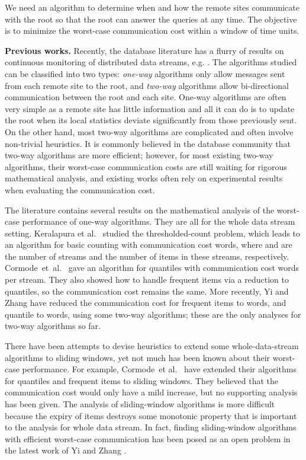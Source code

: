 \documentclass[proceedings]{stacs}
\theoremstyle{definition}\newtheorem{fact}{Fact}
\begin{document}
We need an algorithm to determine when and how
the remote sites communicate with the root so that the
root can answer the queries at any time.
The objective is to minimize the worst-case communication cost
within a window of  time units.



\vspace{.5ex}
{\bf Previous works.}
Recently, the database literature has a flurry of results on continuous
monitoring of distributed data streams, e.g.
\cite{OlstonJW03,GreenwaldK04,DasGGR04,SharfmanSK06,
ManjhiSDO05,CormodeGMR05,BabcockO03,JainYDZ05,MouratidisBP06,CormodeG05}.
The algorithms studied can be classified into two
types: {\em one-way} algorithms only allow messages
sent from each remote site to the root, and
{\em two-way} algorithms allow bi-directional
communication between the root and each site.
One-way algorithms are often very simple
as a remote site has little
information and all it can do is to update the root
when its local statistics deviate significantly from those previously sent.
On the other hand,
most two-way algorithms are complicated and
often involve non-trivial heuristics.
It is commonly believed in the database community
that two-way algorithms
are more efficient; however, for most
existing two-way algorithms, their worst-case communication costs
are still waiting for rigorous mathematical analysis, and
existing works often rely on experimental results when evaluating
the communication cost.



The literature contains several results on the
mathematical analysis of the worst-case
performance of one-way algorithms.
They are all for the whole data stream setting.
Keralapura et al.\ \cite{KeralapuraCR06}
studied the thresholded-count problem, which leads to
an algorithm for basic counting with communication cost
 words, where  and
 are the number of streams and the
number of items in these streams, respectively.
Cormode~et~al.\ \cite{CormodeGMR05} gave an algorithm for
quantiles with communication cost  words per stream.
They also showed how to handle frequent items via
a reduction to quantiles,
so the communication cost remains the same.
More recently,  Yi and Zhang \cite{YiZ08} have reduced
the communication cost for frequent items
to  words,
and quantile to  words, using some two-way algorithms; these are the
only analyses for two-way algorithms so far.

There have been attempts to devise heuristics
to extend some whole-data-stream algorithms to
sliding windows, yet not much has been known about
their worst-case performance.
For example, Cormode~et al.\ \cite{CormodeGMR05} have
extended their algorithms for quantiles and frequent items
to sliding windows.
They believed that the communication cost would only have
a mild increase,
but no supporting analysis has been given.  The
analysis of sliding-window algorithms is more difficult because
the expiry of items destroys some monotonic
property that is important to the analysis for
whole data stream.
In fact,
finding sliding-window algorithms with efficient worst-case
communication has been posed as an open problem
in the latest work of Yi and Zhang \cite{YiZ08}.
\end{document}
